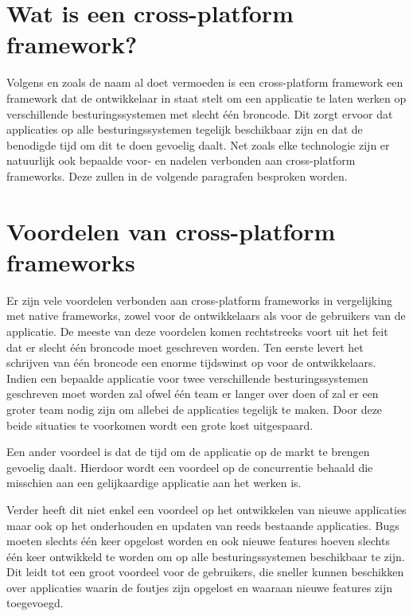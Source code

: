 \section{Wat is een cross-platform framework?}
\label{sec:WatIsCrossPlatform}

 Volgens \textcite{El-Kassas2014} en zoals de naam al doet vermoeden is een cross-platform framework een framework dat de ontwikkelaar in staat stelt om een applicatie te laten werken op verschillende besturingssystemen met slecht één broncode. Dit zorgt ervoor dat applicaties op alle besturingssystemen tegelijk beschikbaar zijn en dat de benodigde tijd om dit te doen gevoelig daalt. Net zoals elke technologie zijn er natuurlijk ook bepaalde voor- en nadelen verbonden aan cross-platform frameworks. Deze zullen in de volgende paragrafen besproken worden.
 
\section{Voordelen van cross-platform frameworks}
\label{sec:voordelenCrossPlatform}

Er zijn vele voordelen verbonden aan cross-platform frameworks in vergelijking met native frameworks, zowel voor de ontwikkelaars als voor de gebruikers van de applicatie. De meeste van deze voordelen komen rechtstreeks voort uit het feit dat er slecht één broncode moet geschreven worden. Ten eerste levert het schrijven van één broncode een enorme tijdswinst op voor de ontwikkelaars. Indien een bepaalde applicatie voor twee verschillende besturingssystemen geschreven moet worden zal ofwel één team er langer over doen of zal er een groter team nodig zijn om allebei de applicaties tegelijk te maken. Door deze beide situaties te voorkomen wordt een grote kost uitgespaard. 

Een ander voordeel is dat de tijd om de applicatie op de markt te brengen gevoelig daalt. Hierdoor wordt een voordeel op de concurrentie behaald die misschien aan een gelijkaardige applicatie aan het werken is. 

Verder heeft dit niet enkel een voordeel op het ontwikkelen van nieuwe applicaties maar ook op het onderhouden en updaten van reeds bestaande applicaties. Bugs moeten slechts één keer opgelost worden en ook nieuwe features hoeven slechts één keer ontwikkeld te worden om op alle besturingssystemen beschikbaar te zijn. Dit leidt tot een groot voordeel voor de gebruikers, die sneller kunnen beschikken over applicaties waarin de foutjes zijn opgelost en waaraan nieuwe features zijn toegevoegd. 

